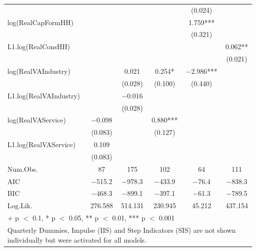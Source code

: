 \begin{table}
{\begin{tabular}[t]{lccccc}
 &  &  &  & (\num{0.024}) & \\
log(RealCapFormHH) &  &  &  & \num{1.759}*** & \\
 &  &  &  & (\num{0.321}) & \\
L1.log(RealConsHH) &  &  &  &  & \num{0.062}**\\
 &  &  &  &  & (\num{0.021})\\
log(RealVAIndustry) &  & \num{0.021} & \num{0.254}* & \num{-2.986}*** & \\
 &  & (\num{0.028}) & (\num{0.100}) & (\num{0.440}) & \\
L1.log(RealVAIndustry) &  & \num{-0.016} &  &  & \\
 &  & (\num{0.028}) &  &  & \\
log(RealVAService) & \num{-0.098} &  & \num{0.880}*** &  & \\
 & (\num{0.083}) &  & (\num{0.127}) &  & \\
L1.log(RealVAService) & \num{0.109} &  &  &  & \\
 & (\num{0.083}) &  &  &  & \\
\midrule
Num.Obs. & \num{87} & \num{175} & \num{102} & \num{64} & \num{111}\\
AIC & \num{-515.2} & \num{-978.3} & \num{-433.9} & \num{-76.4} & \num{-838.3}\\
BIC & \num{-468.3} & \num{-899.1} & \num{-397.1} & \num{-61.3} & \num{-789.5}\\
Log.Lik. & \num{276.588} & \num{514.131} & \num{230.945} & \num{45.212} & \num{437.154}\\
\bottomrule
\multicolumn{6}{l}{\rule{0pt}{1em}+ p $<$ 0.1, * p $<$ 0.05, ** p $<$ 0.01, *** p $<$ 0.001}\\
\multicolumn{6}{l}{\rule{0pt}{1em}Quarterly Dummies, Impulse (IIS) and Step Indicators (SIS) are not shown individually but were activated for all models.}\\
\end{tabular}}
\end{table}

